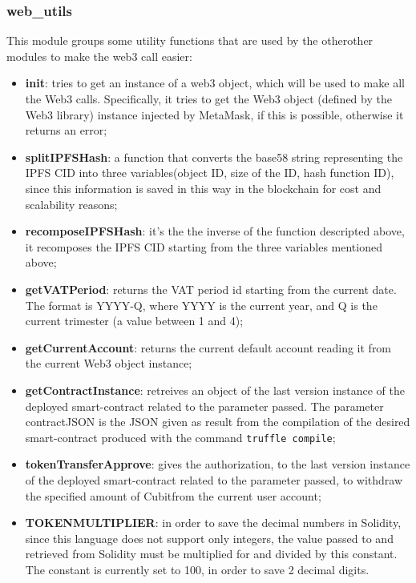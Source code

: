 \subsubsection{web\_utils}
This module groups some utility functions that are used by the otherother modules to make the web3 call easier:
\begin{itemize}
	\item \textbf{init}: tries to get an instance of a web3 object, which will be used to make all the Web3 calls. Specifically, it tries to get the Web3 object (defined by the Web3 library) instance injected by MetaMask\glo, if this is possible, otherwise it returns an error;
	\item \textbf{splitIPFSHash}: a function that converts the base58 string representing the IPFS CID into three variables(object ID, size of the ID, hash function ID), since this information is saved in this way in the blockchain for cost and scalability reasons;
	\item \textbf{recomposeIPFSHash}: it's the the inverse of the function descripted above, it recomposes the IPFS CID starting from the three variables mentioned above;
	\item \textbf{getVATPeriod}: returns the VAT period id starting from the current date. The format is YYYY-Q, where YYYY is the current year, and Q is the current trimester (a value between 1 and 4);
	\item \textbf{getCurrentAccount}: returns the current default account reading it from the current Web3 object instance;
	\item \textbf{getContractInstance}: retreives an object of the last version instance of the deployed smart-contract related to the parameter passed. The parameter contractJSON is the JSON given as result from the compilation of the desired smart-contract produced with the command \texttt{truffle compile};
	\item \textbf{tokenTransferApprove}: gives the authorization, to the last version instance of the deployed smart-contract related to the parameter passed, to withdraw the specified amount of Cubit\glosp from the current user account;
		\item \textbf{TOKENMULTIPLIER}:	 in order to save the decimal numbers in Solidity, since this language does not support only integers, the value passed to and retrieved from Solidity must be multiplied for and divided by this constant. The constant is currently set to 100, in order to save 2 decimal digits.
\end{itemize} 

